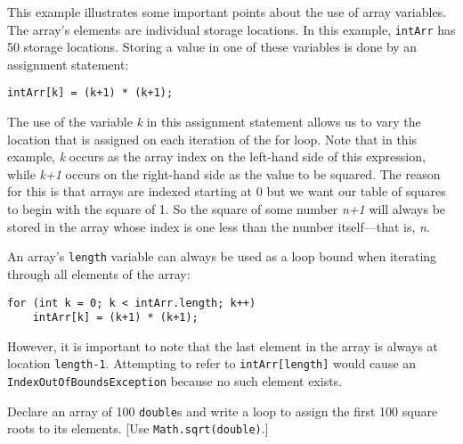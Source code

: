 This example illustrates some important points about the use of
array variables.  The array's elements are individual
storage locations.  In this example, {\tt intArr}
has 50 storage locations.  Storing a value in one of these variables
is done by an assignment statement:

\begin{jjjlisting}
\begin{lstlisting}
intArr[k] = (k+1) * (k+1);
\end{lstlisting}
\end{jjjlisting}

\noindent The use of the variable {\it k} in this assignment
statement allows us to vary the location that is assigned on each
iteration of the for loop.  Note that in this example, {\it k} occurs as
the array index on the left-hand side of this expression, while
{\it k+1} occurs on the right-hand side as the value to be squared.  The
reason for this is that arrays are indexed starting at 0 but we want
our table of squares to begin with the square of 1. So the square of
some number {\it n+1} will always be stored in the array whose index
is one less than the number itself---that 
is, {\it n}.

An array's {\tt length} variable can always be used as a loop bound
when iterating through all elements of the array:

\begin{jjjlisting}
\begin{lstlisting}
for (int k = 0; k < intArr.length; k++)
    intArr[k] = (k+1) * (k+1);
\end{lstlisting}
\end{jjjlisting}

\noindent However, it is important to note that the last element in
the array is always at location \verb|length-1|. Attempting to refer
to {\tt intArr[length]}
would cause an {\tt IndexOutOfBoundsException} because no such element
exists.


\begin{SSTUDY}

\item  Declare an array of 100 {\tt double}s and write a loop to assign the
first 100 square roots to its elements.  [Use {\tt Math.sqrt(double)}.]

\end{SSTUDY}

